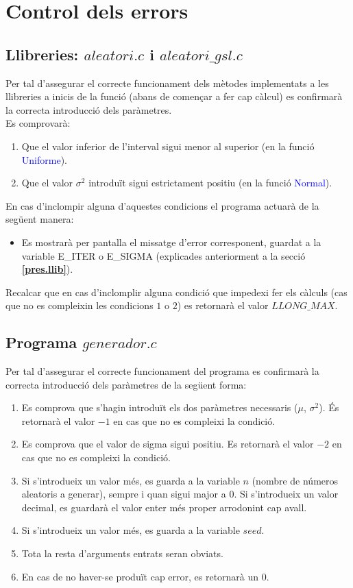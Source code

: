 \documentclass[a4paper, 11pt]{article}
\begin{document}
\newpage
\section{Control dels errors}
\subsection{Llibreries: $aleatori.c$ i $aleatori\_gsl.c$}
Per tal d'assegurar el correcte funcionament dels mètodes implementats a les llibreries a inicis de la funció (abans de començar a fer cap càlcul) es confirmarà la correcta introducció dels paràmetres.\\
Es comprovarà:
\begin{enumerate}
    \item Que el valor inferior de l'interval sigui menor al superior (en la funció \textcolor{blue}{Uniforme}).
    \item Que el valor $\sigma^2$ introduït sigui estrictament positiu (en la funció \textcolor{blue}{Normal}).
\end{enumerate}
En cas d'inclompir alguna d'aquestes condicions el programa actuarà de la següent manera:
\begin{itemize}
    \item Es mostrarà per pantalla el missatge d'error corresponent, guardat a la variable \textcolor{Dandelion}{E\_ITER} o \textcolor{Dandelion}{E\_SIGMA} (explicades anteriorment a la secció \textcolor{blue}{\textbf{\ref{pres.llib}}}).
\end{itemize}
Recalcar que en cas d'inclomplir alguna condició que impedexi fer els càlculs (cas que no es compleixin les condicions $1$ o $2$) es retornarà el valor $LLONG\_MAX$.
\newpage
\subsection{Programa $generador.c$}\label{com_er}
Per tal d’assegurar el correcte funcionament del programa es confirmarà la correcta introducció
dels paràmetres de la següent forma:
\begin{enumerate}
    \item Es comprova que s'hagin introduït els dos paràmetres necessaris ($\mu$, $\sigma^2$). És retornarà el valor $-1$ en cas que no es compleixi la condició.
    \item Es comprova que el valor de sigma sigui positiu. Es retornarà el valor $-2$ en cas que no es compleixi la condició.
    \item Si s'introdueix un valor més, es guarda a la variable $n$ (nombre de números aleatoris a generar), sempre i quan sigui major a $0$. Si s'introdueix un valor decimal, es guardarà el valor enter més proper arrodonint cap avall.
    \item Si s'introdueix un valor més, es guarda a la variable $seed$.
    \item Tota la resta d'arguments entrats seran obviats.
    \item En cas de no haver-se produït cap error, es retornarà un $0$.
\end{enumerate}
\vspace{2em}
\end{document}
